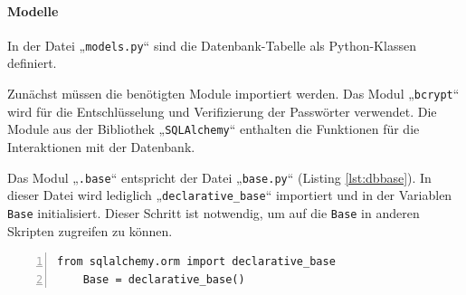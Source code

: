 \documentclass[12pt, letterpaper]{article}
\begin{document}
  \paragraph{Modelle}
  \par \textbf{}
  \par In der Datei „\texttt{models.py}“ sind die Datenbank-Tabelle als Python-Klassen definiert. 
  \par Zunächst müssen die benötigten Module importiert werden. Das Modul „\texttt{bcrypt}“ \cite{bcrypt} wird für die Entschlüsselung und Verifizierung der Passwörter verwendet. Die Module aus der Bibliothek „\texttt{SQLAlchemy}“ enthalten die Funktionen für die Interaktionen mit der Datenbank. 
  \par Das Modul „\texttt{.base}“ entspricht der Datei „\texttt{base.py}“ (Listing \ref{lst:dbbase}). In dieser Datei wird lediglich „\texttt{declarative\_base}“ importiert und in der Variablen \texttt{Base} initialisiert. Dieser Schritt ist notwendig, um auf die \texttt{Base} in anderen Skripten zugreifen zu können.
  \begin{lstlisting}[frame=single, style=py, numbers=left, label={lst:dbbase}, caption={db: base.py}]
    from sqlalchemy.orm import declarative_base
    Base = declarative_base()
  \end{lstlisting}   
 
\end{document}
